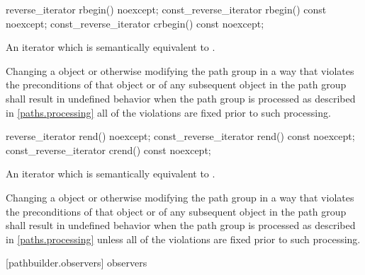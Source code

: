 \begin{itemdecl}
reverse_iterator rbegin() noexcept;
const_reverse_iterator rbegin() const noexcept;
const_reverse_iterator crbegin() const noexcept;
\end{itemdecl}
\begin{itemdescr}
\pnum
\returns
An iterator which is semantically equivalent to .

\pnum
\remarks
Changing a  object or otherwise modifying the path group in a way that violates the preconditions of that  object or of any subsequent  object in the path group shall result in undefined behavior when the path group is processed as described in \ref{paths.processing} all of the violations are fixed prior to such processing.
\end{itemdescr}

\begin{itemdecl}
reverse_iterator rend() noexcept;
const_reverse_iterator rend() const noexcept;
const_reverse_iterator crend() const noexcept;
\end{itemdecl}
\begin{itemdescr}
\pnum
\returns
An iterator which is semantically equivalent to .

\pnum
\remarks
Changing a  object or otherwise modifying the path group in a way that violates the preconditions of that  object or of any subsequent  object in the path group shall result in undefined behavior when the path group is processed as described in \ref{paths.processing} unless all of the violations are fixed prior to such processing.
\end{itemdescr}

 [pathbuilder.observers] { observers}

